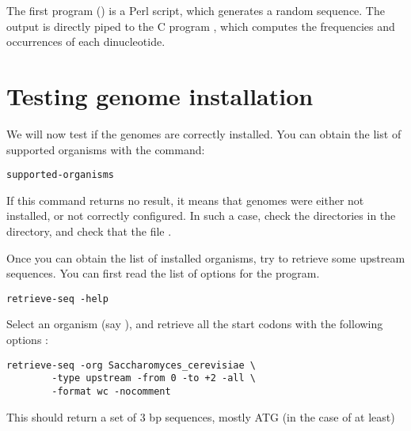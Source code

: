 \documentclass{book}
\begin{document}
The first program () is a Perl script, which
generates a random sequence. The output is directly piped to the C
program , which computes the frequencies and
occurrences of each dinucleotide.

\section{Testing genome installation}

We will now test if the genomes are correctly installed. You can
obtain the list of supported organisms with the command:

\begin{footnotesize}
\begin{verbatim}
supported-organisms
\end{verbatim}
\end{footnotesize}


If this command returns no result, it means that genomes were either
not installed, or not correctly configured. In such a case, check the
directories in the  directory, and check that the
file .

Once you can obtain the list of installed organisms, try to retrieve
some upstream sequences. You can first read the list of options for the
 program.

\begin{footnotesize}
\begin{verbatim}
retrieve-seq -help
\end{verbatim}
\end{footnotesize}


Select an organism (say ), and
retrieve all the start codons with the following options :

\begin{footnotesize}
\begin{verbatim}
retrieve-seq -org Saccharomyces_cerevisiae \
        -type upstream -from 0 -to +2 -all \
        -format wc -nocomment
\end{verbatim}
\end{footnotesize}


This should return a set of 3 bp sequences, mostly ATG (in the case of
 at least)

\end{document}
